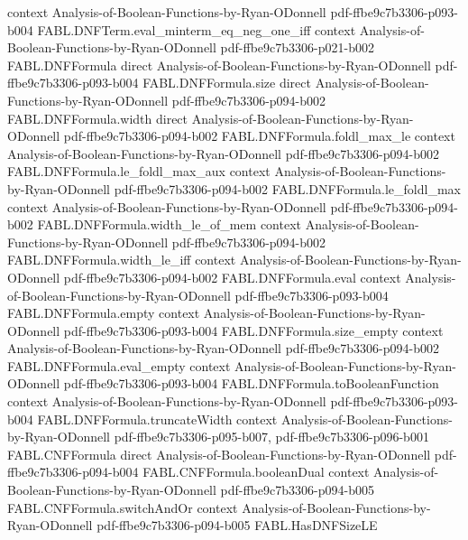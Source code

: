\begin{theorem}
  {context}
  {Analysis-of-Boolean-Functions-by-Ryan-ODonnell}
  {pdf-ffbe9c7b3306-p093-b004}
\proofstep
  {FABL.DNFTerm.eval_minterm_eq_neg_one_iff}
  {context}
  {Analysis-of-Boolean-Functions-by-Ryan-ODonnell}
  {pdf-ffbe9c7b3306-p021-b002}
\proofstep
  {FABL.DNFFormula}
  {direct}
  {Analysis-of-Boolean-Functions-by-Ryan-ODonnell}
  {pdf-ffbe9c7b3306-p093-b004}
\proofstep
  {FABL.DNFFormula.size}
  {direct}
  {Analysis-of-Boolean-Functions-by-Ryan-ODonnell}
  {pdf-ffbe9c7b3306-p094-b002}
\proofstep
  {FABL.DNFFormula.width}
  {direct}
  {Analysis-of-Boolean-Functions-by-Ryan-ODonnell}
  {pdf-ffbe9c7b3306-p094-b002}
\proofstep
  {FABL.DNFFormula.foldl_max_le}
  {context}
  {Analysis-of-Boolean-Functions-by-Ryan-ODonnell}
  {pdf-ffbe9c7b3306-p094-b002}
\proofstep
  {FABL.DNFFormula.le_foldl_max_aux}
  {context}
  {Analysis-of-Boolean-Functions-by-Ryan-ODonnell}
  {pdf-ffbe9c7b3306-p094-b002}
\proofstep
  {FABL.DNFFormula.le_foldl_max}
  {context}
  {Analysis-of-Boolean-Functions-by-Ryan-ODonnell}
  {pdf-ffbe9c7b3306-p094-b002}
\proofstep
  {FABL.DNFFormula.width_le_of_mem}
  {context}
  {Analysis-of-Boolean-Functions-by-Ryan-ODonnell}
  {pdf-ffbe9c7b3306-p094-b002}
\proofstep
  {FABL.DNFFormula.width_le_iff}
  {context}
  {Analysis-of-Boolean-Functions-by-Ryan-ODonnell}
  {pdf-ffbe9c7b3306-p094-b002}
\proofstep
  {FABL.DNFFormula.eval}
  {context}
  {Analysis-of-Boolean-Functions-by-Ryan-ODonnell}
  {pdf-ffbe9c7b3306-p093-b004}
\proofstep
  {FABL.DNFFormula.empty}
  {context}
  {Analysis-of-Boolean-Functions-by-Ryan-ODonnell}
  {pdf-ffbe9c7b3306-p093-b004}
\proofstep
  {FABL.DNFFormula.size_empty}
  {context}
  {Analysis-of-Boolean-Functions-by-Ryan-ODonnell}
  {pdf-ffbe9c7b3306-p094-b002}
\proofstep
  {FABL.DNFFormula.eval_empty}
  {context}
  {Analysis-of-Boolean-Functions-by-Ryan-ODonnell}
  {pdf-ffbe9c7b3306-p093-b004}
\proofstep
  {FABL.DNFFormula.toBooleanFunction}
  {context}
  {Analysis-of-Boolean-Functions-by-Ryan-ODonnell}
  {pdf-ffbe9c7b3306-p093-b004}
\proofstep
  {FABL.DNFFormula.truncateWidth}
  {context}
  {Analysis-of-Boolean-Functions-by-Ryan-ODonnell}
  {pdf-ffbe9c7b3306-p095-b007,
    pdf-ffbe9c7b3306-p096-b001}
\proofstep
  {FABL.CNFFormula}
  {direct}
  {Analysis-of-Boolean-Functions-by-Ryan-ODonnell}
  {pdf-ffbe9c7b3306-p094-b004}
\proofstep
  {FABL.CNFFormula.booleanDual}
  {context}
  {Analysis-of-Boolean-Functions-by-Ryan-ODonnell}
  {pdf-ffbe9c7b3306-p094-b005}
\proofstep
  {FABL.CNFFormula.switchAndOr}
  {context}
  {Analysis-of-Boolean-Functions-by-Ryan-ODonnell}
  {pdf-ffbe9c7b3306-p094-b005}
\proofstep
  {FABL.HasDNFSizeLE}

\end{theorem}
